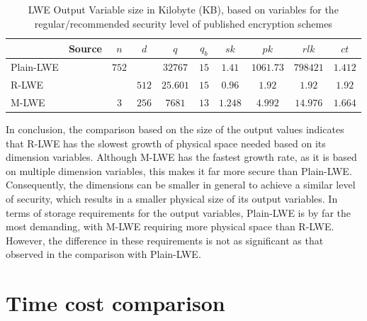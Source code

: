 \begin{table}[h]
  \centering
  \caption{LWE Output Variable size in Kilobyte (KB), based on variables for the regular/recommended security level of published encryption schemes}
  \begin{tabular}{|l|c||c|c|c|c||c|c|c|c|}
    \toprule
              & Source                      & $n$   & $d$   & $q$      & $q_b$ & $sk$    & $pk$      & $rlk$    & $ct$    \\
    \midrule
    Plain-LWE & \cite{frodo}                & $752$ &       & $32767$ & $15$  & $1.41$  & $1061.73$ & $798421$ & $1.412$ \\
    R-LWE     & \cite{PracticalKeyExchange} &       & $512$ & $25.601$ & $15$  & $0.96$  & $1.92$    & $1.92$   & $1.92$  \\
    M-LWE     & \cite{CyrstalsKyber}        & $3$   & $256$ & $7681$   & $13$  & $1.248$ & $4.992$   & $14.976$ & $1.664$ \\
    \bottomrule
  \end{tabular}
  \label{table:OutputVariableInKB}
\end{table}

In conclusion, the comparison based on the size of the output values indicates that R-LWE has the slowest growth of physical space needed based on its dimension variables. Although M-LWE has the fastest growth rate, as it is based on multiple dimension variables, this makes it far more secure than Plain-LWE. Consequently, the dimensions can be smaller in general to achieve a similar level of security, which results in a smaller physical size of its output variables. In terms of storage requirements for the output variables, Plain-LWE is by far the most demanding, with M-LWE requiring more physical space than R-LWE. However, the difference in these requirements is not as significant as that observed in the comparison with Plain-LWE.

\section{Time cost comparison}

